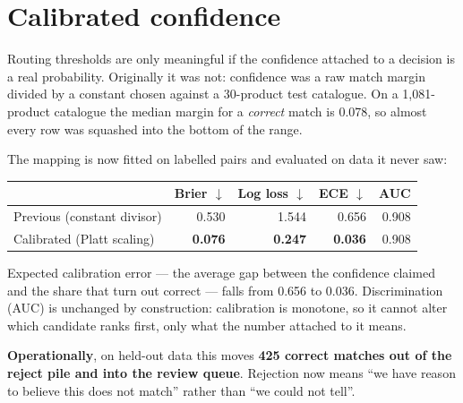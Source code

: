 \section{Calibrated confidence}\label{sec:cal}

Routing thresholds are only meaningful if the confidence attached to a decision
is a real probability. Originally it was not: confidence was a raw match margin
divided by a constant chosen against a 30-product test catalogue. On a
1{,}081-product catalogue the median margin for a \emph{correct} match is 0.078,
so almost every row was squashed into the bottom of the range.

The mapping is now fitted on labelled pairs and evaluated on data it never saw:

\begin{center}
\begin{tabular}{@{}lrrrr@{}}
\toprule
& \textbf{Brier} $\downarrow$ & \textbf{Log loss} $\downarrow$ & \textbf{ECE} $\downarrow$ & \textbf{AUC} \\
\midrule
Previous (constant divisor) & 0.530 & 1.544 & 0.656 & 0.908 \\
Calibrated (Platt scaling)  & \textbf{0.076} & \textbf{0.247} & \textbf{0.036} & 0.908 \\
\bottomrule
\end{tabular}
\end{center}

Expected calibration error --- the average gap between the confidence claimed and
the share that turn out correct --- falls from 0.656 to 0.036. Discrimination
(AUC) is unchanged by construction: calibration is monotone, so it cannot alter
which candidate ranks first, only what the number attached to it means.

\textbf{Operationally}, on held-out data this moves \textbf{425 correct matches out of
the reject pile and into the review queue}. Rejection now means ``we have reason
to believe this does not match'' rather than ``we could not tell''.


